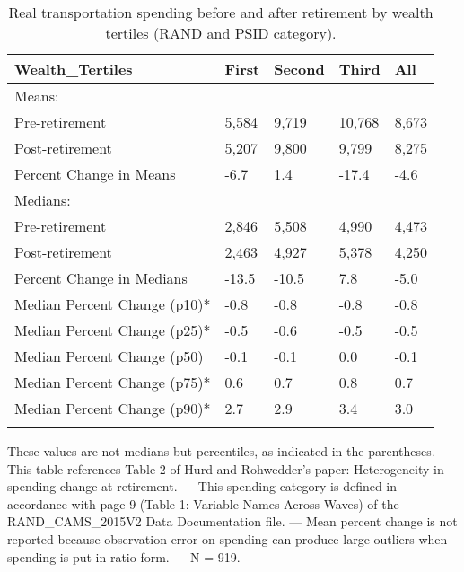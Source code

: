\begin{table}[tbp] \centering
{}

\caption{Real transportation spending before and after retirement by wealth tertiles (RAND and PSID category).}
\begin{tabularx}{\textwidth}{lCCCC}

\toprule
{Wealth\_Tertiles}&{First}&{Second}&{Third}&{All} \tabularnewline
\midrule\addlinespace[1.5ex]
Means:&&&& \tabularnewline
\midrule Pre-retirement&5,584&9,719&10,768&8,673 \tabularnewline
Post-retirement&5,207&9,800&9,799&8,275 \tabularnewline
Percent Change in Means&-6.7&1.4&-17.4&-4.6 \tabularnewline
\midrule Medians:&&&& \tabularnewline
\midrule Pre-retirement&2,846&5,508&4,990&4,473 \tabularnewline
Post-retirement&2,463&4,927&5,378&4,250 \tabularnewline
Percent Change in Medians&-13.5&-10.5&7.8&-5.0 \tabularnewline
Median Percent Change (p10)*&-0.8&-0.8&-0.8&-0.8 \tabularnewline
Median Percent Change (p25)*&-0.5&-0.6&-0.5&-0.5 \tabularnewline
Median Percent Change (p50)&-0.1&-0.1&0.0&-0.1 \tabularnewline
Median Percent Change (p75)*&0.6&0.7&0.8&0.7 \tabularnewline
Median Percent Change (p90)*&2.7&2.9&3.4&3.0 \tabularnewline
\bottomrule \addlinespace[1.5ex]

\end{tabularx}
\begin{flushleft}
\footnotesize *These values are not medians but percentiles, as indicated in the parentheses. \linebreak --- \linebreak This table references Table 2 of Hurd and Rohwedder's paper: Heterogeneity in spending change at retirement. \linebreak --- \linebreak This spending category is defined in accordance with page 9 (Table 1: Variable Names Across Waves) of the RAND\_CAMS\_2015V2 Data Documentation file. \linebreak --- \linebreak Mean percent change is not reported because observation error on spending can produce large outliers when spending is put in ratio form. \linebreak --- \linebreak N = 919.
\end{flushleft}
\end{table}
